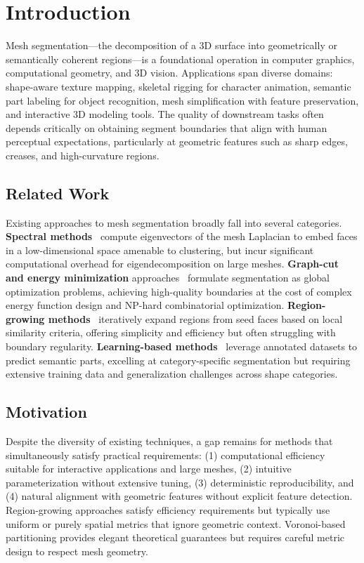 \section{Introduction}

Mesh segmentation---the decomposition of a 3D surface into geometrically or semantically coherent regions---is a foundational operation in computer graphics, computational geometry, and 3D vision. Applications span diverse domains: shape-aware texture mapping, skeletal rigging for character animation, semantic part labeling for object recognition, mesh simplification with feature preservation, and interactive 3D modeling tools. The quality of downstream tasks often depends critically on obtaining segment boundaries that align with human perceptual expectations, particularly at geometric features such as sharp edges, creases, and high-curvature regions.

\subsection{Related Work}

Existing approaches to mesh segmentation broadly fall into several categories. \textbf{Spectral methods}~\cite{liu2004spectral} compute eigenvectors of the mesh Laplacian to embed faces in a low-dimensional space amenable to clustering, but incur significant computational overhead for eigendecomposition on large meshes. \textbf{Graph-cut and energy minimization} approaches~\cite{katz2003hierarchical} formulate segmentation as global optimization problems, achieving high-quality boundaries at the cost of complex energy function design and NP-hard combinatorial optimization. \textbf{Region-growing methods}~\cite{lavoue2005curvature} iteratively expand regions from seed faces based on local similarity criteria, offering simplicity and efficiency but often struggling with boundary regularity. \textbf{Learning-based methods}~\cite{kalogerakis2010learning} leverage annotated datasets to predict semantic parts, excelling at category-specific segmentation but requiring extensive training data and generalization challenges across shape categories.

\subsection{Motivation}

Despite the diversity of existing techniques, a gap remains for methods that simultaneously satisfy practical requirements: (1) computational efficiency suitable for interactive applications and large meshes, (2) intuitive parameterization without extensive tuning, (3) deterministic reproducibility, and (4) natural alignment with geometric features without explicit feature detection. Region-growing approaches satisfy efficiency requirements but typically use uniform or purely spatial metrics that ignore geometric context. Voronoi-based partitioning provides elegant theoretical guarantees but requires careful metric design to respect mesh geometry.

